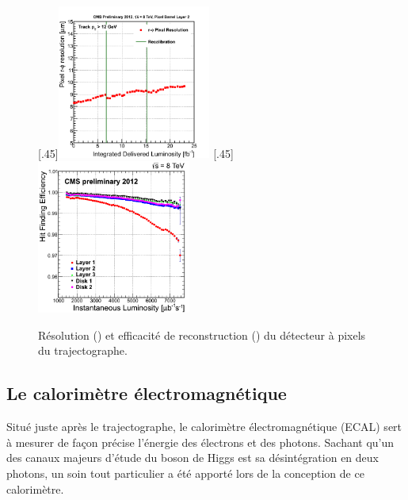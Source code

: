 \begin{figure} \centering
  [.45\textwidth]{\includegraphics[width=0.45\textwidth]{chapitre2/figs/pixel_detector_resolution_over_time.png}}\hfill
  [.45\textwidth]{\includegraphics[width=0.45\textwidth]{chapitre2/figs/pixel_detector_efficiency_over_time.png}}
  \caption{Résolution () et efficacité de reconstruction () du détecteur à pixels du trajectographe.}
\end{figure}

\subsection{Le calorimètre électromagnétique}

Situé juste après le trajectographe, le calorimètre électromagnétique (ECAL) sert à mesurer de façon précise l'énergie des électrons et des photons. Sachant qu'un des canaux majeurs d'étude du boson de Higgs est sa désintégration en deux photons, un soin tout particulier a été apporté lors de la conception de ce calorimètre.

